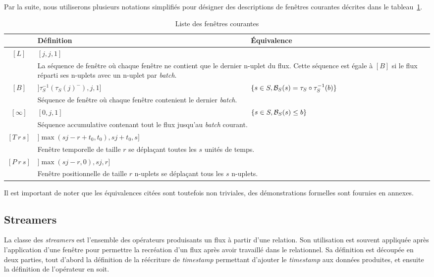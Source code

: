 Par la suite, nous utiliserons plusieurs notations simplifiés pour désigner des descriptions de fenêtres courantes décrites dans le tableau~\ref{tab:windows}.
\begin{table}[ht]
\centering
\begin{tabular}{c||p{}|p{}}
  & Définition & Équivalence \\ \bottomrule
 $[L]$ & $[j,j,1]$ &  \\ 
 & \multicolumn{2}{p{0.8\textwidth}}{La séquence de fenêtre où chaque fenêtre ne contient que le dernier n-uplet du flux. Cette séquence est égale à $[B]$ si le flux réparti ses n-uplets avec un n-uplet par \textit{batch}.} \\ \hline
 $[B]$ & $]\tau_S^{-1}(\tau_S(j)^-),j,1]$ & $\{s\in S, \mathcal{B}_S(s) = \tau_S\circ\tau_S^{-1}(b)\}$ \\ 
 & \multicolumn{2}{p{0.8\textwidth}}{Séquence de fenêtre où chaque fenêtre contenient le dernier \textit{batch}.} \\\hline
 $[\infty]$ & $[0,j,1]$ & $\{s\in S, \mathcal{B}_S(s) \leq b\}$ \\
 & \multicolumn{2}{p{0.8\textwidth}}{Séquence accumulative contenant tout le flux jusqu'au \textit{batch} courant.} \\\hline
 $[T\ r\ s]$ & $]\max(sj-r+t_0,t_0),sj+t_0,s]$ &  \\
 & \multicolumn{2}{p{0.8\textwidth}}{Fenêtre temporelle de taille $r$ se déplaçant toutes les $s$ unités de temps.} \\\hline
 $[P\ r\ s]$ & $]\max(sj-r,0),sj,r]$ &  \\
 & \multicolumn{2}{p{0.8\textwidth}}{Fenêtre positionnelle de taille $r$ n-uplets se déplaçant tous les $s$ n-uplets.} \\
 \toprule
\end{tabular}
\caption{Liste des fenêtres courantes} \label{tab:windows}
\end{table}

Il est important de noter que les équivalences citées sont toutefois non triviales, des démonstrations formelles sont fournies en annexes.

\subsection{Streamers}
La classe des \textit{streamers} est l'ensemble des opérateurs produisants un flux à partir d'une relation. Son utilisation est souvent appliquée après l'application d'une fenêtre pour permettre la recréation d'un flux après avoir travaillé dans le relationnel. Sa définition est découpée en deux parties, tout d'abord la définition de la réécriture de \textit{timestamp} permettant d'ajouter le \textit{timestamp} aux données produites, et ensuite la définition de l'opérateur en soit.
